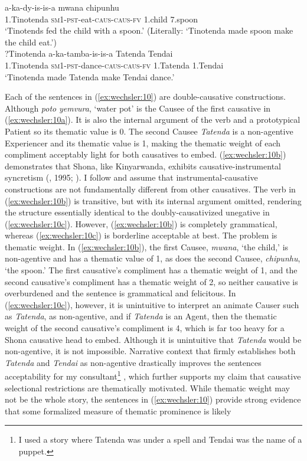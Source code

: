 \documentclass[output=paper,modfonts,nonflat]{langsci/langscibook}
\begin{document}
\ex\label{ex:wechsler:10b}  
 {a-ka-dy-is-is-a}  {{mwana}}  {{chipunhu}}\\
 1.Tinotenda  \textsc{sm}1-\textsc{pst}{}-eat-\textsc{caus}{}-\textsc{caus}{}-\textsc{fv}  {1.child}  {7.spoon}\\
\glt `Tinotends fed the child with a spoon.’
(Literally: ‘Tinotenda made spoon make the child eat.’)\\

\ex\label{ex:wechsler:10c}
?{Tinotenda}  {{a-ka-tamba-is-is-a}}  {{Tatenda}}  {{Tendai}}\\
 1.Tinotenda  {\textsc{sm}1-\textsc{pst}{}-dance-\textsc{caus}{}-\textsc{caus}{}-\textsc{fv}}  {1.Tatenda}  {1.Tendai}\\
\glt `Tinotenda made Tatenda make Tendai dance.'
\z
\z

Each of the sentences in (\ref{ex:wechsler:10}) are double-causative constructions. Although \textit{poto} \textit{yemvura}, ‘water pot’ is the Causee of the first causative in (\ref{ex:wechsler:10a}). It is also the internal argument of the verb and a prototypical Patient so its thematic value is 0. The second Causee \textit{Tatenda} is a non-agentive Experiencer and its thematic value is 1, making the thematic weight of each compliment acceptably light for both causatives to embed. (\ref{ex:wechsler:10b}) demonstrates that Shona, like Kinyarwanda, exhibits causative-instrumental syncretism (\citealt{Kimenyi1980}, 1995; \citealt{Peterson2007,Jerro2013}). I follow \citet{Jerro2013} and assume that instrumental-causative constructions are not fundamentally different from other causatives. The verb in (\ref{ex:wechsler:10b}) is transitive, but with its internal argument omitted, rendering the structure essentially identical to the doubly-causativized unegative in (\ref{ex:wechsler:10c}). However, (\ref{ex:wechsler:10b}) is completely grammatical, whereas (\ref{ex:wechsler:10c}) is borderline acceptable at best. The problem is thematic weight. In (\ref{ex:wechsler:10b}), the first Causee, \textit{mwana}, ‘the child,’ is non-agentive and has a thematic value of 1, as does the second Causee, \textit{chipunhu}, ‘the spoon.’ The first causative’s compliment has a thematic weight of 1, and the second causative’s compliment has a thematic weight of 2, so neither causative is overburdened and the sentence is grammatical and felicitous. In (\ref{ex:wechsler:10c}), however, it is unintuitive to interpret an animate Causer such as \textit{Tatenda}, as non-agentive, and if \textit{Tatenda} is an Agent, then the thematic weight of the second causative’s compliment is 4, which is far too heavy for a Shona causative head to embed. Although it is unintuitive that \textit{Tatenda} would be non-agentive, it is not impossible. Narrative context that firmly establishes both \textit{Tatenda} and \textit{Tendai} as non-agentive drastically improves the sentences acceptability for my consultant\footnote{I used a story where Tatenda was under a spell and Tendai was the name of a puppet.} , which further supports my claim that causative selectional restrictions are thematically motivated. While thematic weight may not be the whole story, the sentences in (\ref{ex:wechsler:10}) provide strong evidence that some formalized measure of thematic prominence is likely 
\end{document}
